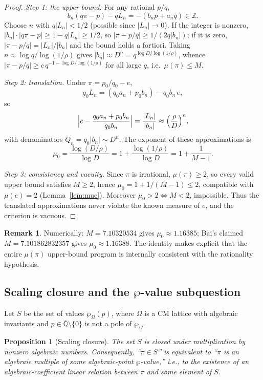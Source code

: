 \documentclass[11pt]{amsart}
\newtheorem{proposition}[theorem]{Proposition}
\theoremstyle{definition}
\newtheorem{remark}[theorem]{Remark}
\theoremstyle{remark}
\numberwithin{equation}{section}
\newcommand{\Z}{\mathbb{Z}}
\newcommand{\Qbar}{\overline{\mathbb{Q}}}
\newcommand{\irr}{\mu}
\newcommand{\ee}{e}
\begin{document}
\begin{proof}
\emph{Step 1: the upper bound.} For any rational $p/q$,
\[
b_n(q\pi-p)-qL_n=-(b_np+a_nq)\in\Z.
\]
Choose $n$ with $q|L_n|<1/2$ (possible since $|L_n|\to0$). If the integer is nonzero, $|b_n|\cdot|q\pi-p|\ge1-q|L_n|\ge1/2$, so $|\pi-p/q|\ge1/(2q|b_n|)$; if it is zero, $|\pi-p/q|=|L_n|/|b_n|$ and the bound holds a fortiori. Taking $n\approx\log q/\log(1/\rho)$ gives $|b_n|\approx D^n=q^{\log D/\log(1/\rho)}$, whence $|\pi-p/q|\ge c\,q^{-1-\log D/\log(1/\rho)}$ for all large $q$, i.e.\ $\irr(\pi)\le M$.

\emph{Step 2: translation.} Under $\pi=p_0/q_0-e$,
\[
q_0L_n=(q_0a_n+p_0b_n)-q_0b_n\,e,
\]
so
\[
\Bigl|e-\frac{q_0a_n+p_0b_n}{q_0b_n}\Bigr|=\frac{|L_n|}{|b_n|}\approx\Bigl(\frac\rho D\Bigr)^n,
\]
with denominators $Q_n=q_0|b_n|\sim D^n$. The exponent of these approximations is
\[
\irr_0=\frac{\log(D/\rho)}{\log D}=1+\frac{\log(1/\rho)}{\log D}=1+\frac1{M-1}.
\]

\emph{Step 3: consistency and vacuity.} Since $\pi$ is irrational, $\irr(\pi)\ge2$, so every valid upper bound satisfies $M\ge2$, hence $\irr_0=1+1/(M-1)\le2$, compatible with $\irr(\ee)=2$ (Lemma~\ref{lem:mue}). Moreover $\irr_0>2\iff M<2$, impossible. Thus the translated approximations never violate the known measure of $\ee$, and the criterion is vacuous.
\end{proof}

\begin{remark}
Numerically: $M=7.10320534$ gives $\irr_0\approx1.16385$; Bai's claimed $M=7.101862832357$ \cite{Bai2026} gives $\irr_0\approx1.16388$. The identity makes explicit that the entire $\irr(\pi)$ upper-bound program is internally consistent with the rationality hypothesis.
\end{remark}

\subsection{Scaling closure and the \texorpdfstring{$\wp$}{wp}-value subquestion}

Let $S$ be the set of values $\wp_\Omega(p)$, where $\Omega$ is a CM lattice with algebraic invariants and $p\in\Qbar\setminus\{0\}$ is not a pole of $\wp_\Omega$.

\begin{proposition}[Scaling closure]\label{prop:scaling}
The set $S$ is closed under multiplication by nonzero algebraic numbers. Consequently, ``$\pi\in S$'' is equivalent to ``$\pi$ is an algebraic multiple of some algebraic-point $\wp$-value,'' i.e., to the existence of an algebraic-coefficient linear relation between $\pi$ and some element of $S$.
\end{proposition}
\end{document}
